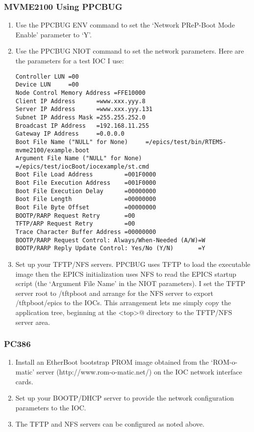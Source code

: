 \documentclass{report}
\begin{document}
\subsubsection{MVME2100 Using PPCBUG}
\begin{enumerate}
\item Use the PPCBUG ENV command to set the `Network PReP-Boot Mode Enable'
parameter to `Y'.
\item Use the PPCBUG NIOT command to set the network parameters.  Here are the
parameters for a test IOC I use:
\begin{verbatim}
Controller LUN =00
Device LUN     =00
Node Control Memory Address =FFE10000
Client IP Address      =www.xxx.yyy.8
Server IP Address      =www.xxx.yyy.131
Subnet IP Address Mask =255.255.252.0
Broadcast IP Address   =192.168.11.255
Gateway IP Address     =0.0.0.0
Boot File Name ("NULL" for None)     =/epics/test/bin/RTEMS-mvme2100/example.boot
Argument File Name ("NULL" for None) =/epics/test/iocBoot/iocexample/st.cmd
Boot File Load Address         =001F0000
Boot File Execution Address    =001F0000
Boot File Execution Delay      =00000000
Boot File Length               =00000000
Boot File Byte Offset          =00000000
BOOTP/RARP Request Retry       =00
TFTP/ARP Request Retry         =00
Trace Character Buffer Address =00000000
BOOTP/RARP Request Control: Always/When-Needed (A/W)=W
BOOTP/RARP Reply Update Control: Yes/No (Y/N)       =Y
\end{verbatim}
\item Set up your TFTP/NFS servers.  PPCBUG uses TFTP
to load the executable image then the EPICS initialization uses
NFS to read the EPICS startup script (the `Argument File Name' in the NIOT
parameters).
I set the TFTP server root to /tftpboot and arrange for the NFS server to
export /tftpboot/epics to the IOCs.  This arrangement lets me simply copy the
application tree, beginning at the \verb@<top>@ directory to the TFTP/NFS server area.
\end{enumerate}

\subsubsection{PC386}
\begin{enumerate}
\item Install an EtherBoot bootstrap PROM image obtained from
the `ROM-o-matic' server (http://www.rom-o-matic.net/) on the IOC
network interface cards.
\item Set up your BOOTP/DHCP server to provide the network configuration
parameters to the IOC.
\item The TFTP and NFS servers can be configured as noted above.
\end{enumerate}
\end{document}
